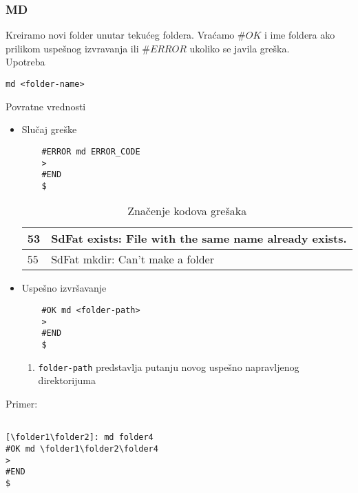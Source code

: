\documentclass[a4paper]{extarticle}
\begin{document}
\subsubsection{MD}
Kreiramo novi folder unutar tekućeg foldera.
Vraćamo  $\#OK$ i ime foldera ako prilikom uspešnog izvravanja ili $\#ERROR$ ukoliko se javila greška.\\
Upotreba
\begin{verbatim}
md <folder-name>
\end{verbatim}
Povratne vrednosti
\begin{itemize}
	\item Slučaj greške\\
	\begin{verbatim}
	#ERROR md ERROR_CODE
	>
	#END
	$
	\end{verbatim}
	
	\begin{table}[h]
		\centering
		\begin{tabular}{|l|l|}
			\hline
			53 & SdFat exists: File with the same name already exists. \\ \hline
			55 & SdFat mkdir: Can't make a folder                      \\ \hline
		\end{tabular}
		\caption{Značenje kodova grešaka}
		\label{tab:my-table}
	\end{table}
	\item Uspešno izvršavanje\\
	\begin{verbatim}
	#OK md <folder-path>
	>
	#END
	$
	\end{verbatim}
	\begin{enumerate}
		\item \verb|folder-path| predstavlja putanju novog uspešno napravljenog direktorijuma
	\end{enumerate}
\end{itemize}
Primer:
\begin{verbatim}

[\folder1\folder2]: md folder4
#OK md \folder1\folder2\folder4
>
#END
$
\end{verbatim}
\end{document}

